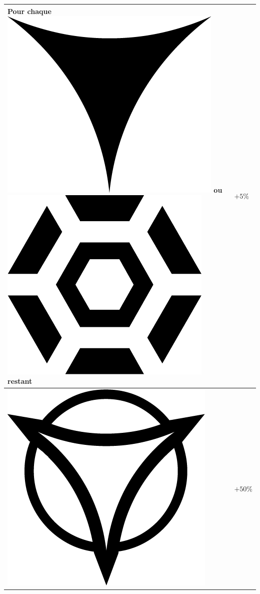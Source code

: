 \documentclass{article}
\begin{document}
\begin{multicols}{2}
\begin{tabular}[b]{|p{5cm}|p{1cm}|}
		Pour chaque {\Large \includegraphics[height=\fontcharht\font`\B]{../img/result_echec_failure}} ou {\Large \includegraphics[height=\fontcharht\font`\B]{../img/result_menace_threat}} restant & $+5\%$ \\  
		\hline 
		{\Large \includegraphics[height=\fontcharht\font`\B]{../img/result_desastre_despair}} & $+50\%$ \\ 

\end{tabular}
\end{multicols}
\end{document}
